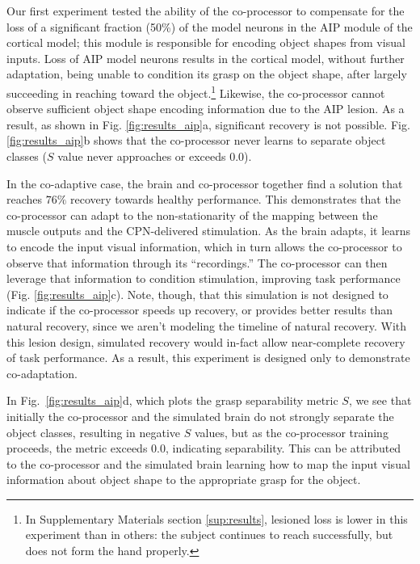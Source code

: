\documentclass[12pt]{iopart}
\begin{document}
Our first experiment tested the ability of the co-processor to compensate for the loss of a significant
fraction (50\%) of the model neurons in the AIP module of the cortical model; this module is responsible for encoding
object shapes from visual inputs. Loss of AIP model neurons results in the cortical model, without further adaptation,
being unable to condition its grasp on the object shape, after largely succeeding in reaching toward the object.\footnote{
In Supplementary Materials section \ref{sup:results}, lesioned loss is lower in this experiment than in others: the subject
continues to reach successfully, but does not form the hand properly.} Likewise, the co-processor cannot observe sufficient
object shape encoding information due to the AIP lesion. As a result, as shown in Fig. \ref{fig:results_aip}a, significant
recovery is not possible. Fig. \ref{fig:results_aip}b shows that the co-processor never learns to separate object classes
($S$ value never approaches or exceeds $0.0$).

In the co-adaptive case, the brain and co-processor together find a solution that reaches $76\%$ recovery towards healthy
performance. This demonstrates that the co-processor can adapt to the non-stationarity
of the mapping between the muscle outputs and the CPN-delivered stimulation.
As the brain adapts, it learns to encode the input visual information, which in turn allows the co-processor
to observe that information through its ``recordings.'' The co-processor can then leverage that information to condition
stimulation, improving task performance (Fig. \ref{fig:results_aip}c). Note, though, that this simulation is not designed
to indicate if the co-processor speeds up recovery, or provides better results than natural recovery, since we aren't
modeling the timeline of natural recovery. With this lesion design, simulated recovery would in-fact allow near-complete
recovery of task performance. As a result, this experiment is designed  only to demonstrate co-adaptation.

In Fig.~\ref{fig:results_aip}d, which plots the grasp  separability metric $S$, we see that initially
the co-processor and the simulated brain do not strongly separate the object classes, resulting in negative $S$ values,
but as the co-processor  training proceeds, the metric exceeds 0.0, indicating separability. This can be attributed to
the co-processor and the simulated brain learning how to map the input visual information about object shape to the
appropriate grasp for
the object.
\end{document}
